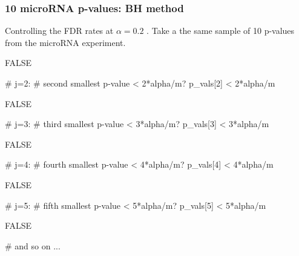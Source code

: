 \documentclass[a4paper]{article}
\begin{document}
\subsubsection{10 microRNA p-values: BH method}
Controlling the FDR rates at \( \alpha = 0.2 \) . Take a the same sample of 10 p-values from the microRNA experiment.
\begin{Schunk}
\begin{Soutput}
[1] FALSE
\end{Soutput}
\begin{Sinput}
# j=2: 
# second smallest p-value < 2*alpha/m?
p_vals[2] < 2*alpha/m
\end{Sinput}
\begin{Soutput}
[1] FALSE
\end{Soutput}
\begin{Sinput}
# j=3: 
# third smallest p-value < 3*alpha/m?
p_vals[3] < 3*alpha/m
\end{Sinput}
\begin{Soutput}
[1] FALSE
\end{Soutput}
\begin{Sinput}
# j=4: 
# fourth smallest p-value < 4*alpha/m?
p_vals[4] < 4*alpha/m
\end{Sinput}
\begin{Soutput}
[1] FALSE
\end{Soutput}
\begin{Sinput}
# j=5: 
# fifth smallest p-value < 5*alpha/m?
p_vals[5] < 5*alpha/m
\end{Sinput}
\begin{Soutput}
[1] FALSE
\end{Soutput}
\begin{Sinput}
# and so on ...
\end{Sinput}
\end{Schunk}
\end{document}
